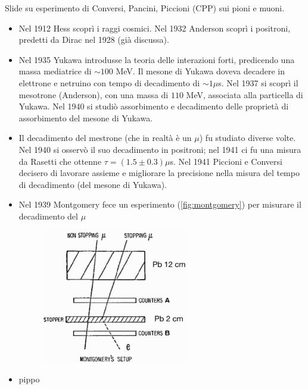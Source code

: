Slide su esperimento di Conversi, Pancini, Piccioni (CPP) sui pioni e muoni.
\begin{itemize}
    \item Nel 1912 Hess scoprì i raggi cosmici. Nel 1932 Anderson scoprì i positroni, predetti da Dirac nel 1928 (già discussa).
    \item Nel 1935 Yukawa introdusse la teoria delle interazioni forti, predicendo una massa mediatrice di $\sim 100$ MeV. Il mesone di Yukawa doveva decadere in elettrone e netruino con tempo di decadimento di $\sim1\mu$s. Nel 1937 si scoprì il mesotrone (Anderson), con una massa di $110$ MeV, associata alla particella di Yukawa. Nel 1940 si studiò assorbimento e decadimento delle proprietà di assorbimento del mesone di Yukawa.
    \item Il decadimento del mestrone (che in realtà è un $\mu$) fu studiato diverse volte. Nel 1940 si osservò il suo decadimento in positroni; nel 1941 ci fu una misura da Rasetti che ottenne $\tau=(1.5\pm0.3)\mu$s. Nel 1941 Piccioni e Conversi decisero di lavorare assieme e migliorare la precisione nella misura del tempo di decadimento (del mesone di Yukawa).
    \item Nel 1939 Montgomery fece un esperimento (\autoref{fig:montgomery}) per misurare il decadimento del $\mu$
    \begin{figure}[h]
        \centering
        \includegraphics[width=0.6\textwidth]{immagini/fig_montgomery.png}
        \caption{}
        \label{fig:montgomery}
      \end{figure}
      \item pippo
\end{itemize}